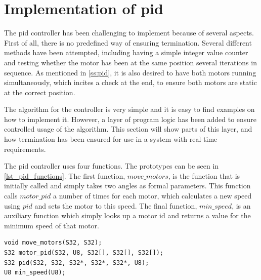 \chapter{Implementation of \gls{pid}}
\label{ss:pid_imp}
The \gls{pid} controller has been challenging to implement because of several aspects. First of all, there is no predefined way of ensuring termination. Several different methods have been attempted, including having a simple integer value counter and testing whether the motor has been at the same position several iterations in sequence. As mentioned in \cref{ss:pid}, it is also desired to have both motors running simultaneously, which incites a check at the end, to ensure both motors are static at the correct position.

The algorithm for the controller is very simple and it is easy to find examples on how to implement it. However, a layer of program logic has been added to ensure controlled usage of the algorithm. This section will show parts of this layer, and how termination has been ensured for use in a system with real-time requirements.

The \gls{pid} controller uses four functions. The prototypes can be seen in \cref{lst_pid_functions}. The first function, $move\_motors$, is the function that is initially called and simply takes two angles as formal parameters. This function calls $motor\_pid$ a number of times for each motor, which calculates a new speed using $pid$ and sets the motor to this speed. The final function, $min\_speed$, is an auxiliary function which simply looks up a motor id and returns a value for the minimum speed of that motor.
\begin{lstlisting}[language=inc_cpp, caption={Prototypes for the \gls{pid} functions}, label=lst_pid_functions]
void move_motors(S32, S32);
S32 motor_pid(S32, U8, S32[], S32[], S32[]);
S32 pid(S32, S32, S32*, S32*, S32*, U8);
U8 min_speed(U8);
\end{lstlisting}

